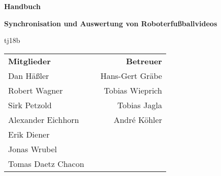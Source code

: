 \begin{titlepage}
\begin{center}
{\Huge\textbf{Handbuch}\vspace{2em}}

{\Large\textbf{Synchronisation und Auswertung von Roboterfußballvideos}\vspace{1em}}

{\textsf{tj18b}\vspace{2em}}

\begin{table}[b]
\begin{tabularx}{\textwidth}{lXr}
\textbf{Mitglieder}&&\textbf{Betreuer}\\
Dan Häßler&&Hans-Gert Gräbe\\
Robert Wagner&&Tobias Wieprich\\
Sirk Petzold&&Tobias Jagla\\
Alexander Eichhorn&&André Köhler\\
Erik Diener&&\\
Jonas Wrubel&&\\
Tomas Daetz Chacon&&\\
\end{tabularx}
\end{table}
\end{center}
\end{titlepage}